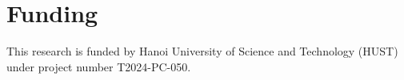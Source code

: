 \section*{Funding}

This research is funded by Hanoi University of Science and Technology (HUST) under project number T2024-PC-050.